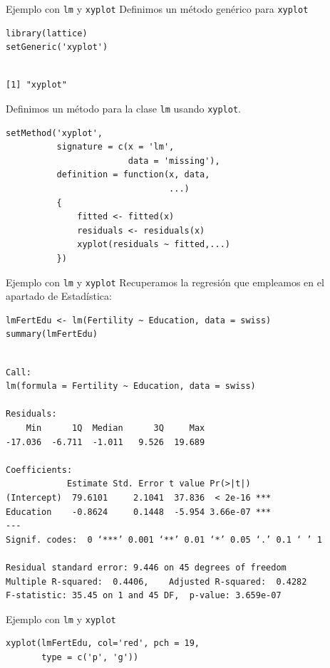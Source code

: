 \documentclass[xcolor={usenames,svgnames,dvipsnames}]{beamer}
\begin{document}
\begin{frame}[label={sec:orgec688bb},fragile]{Ejemplo con \texttt{lm} y \texttt{xyplot}}
 Definimos un método genérico para \texttt{xyplot}
\lstset{language=r,label= ,caption= ,captionpos=b,numbers=none}
\begin{lstlisting}
library(lattice)
setGeneric('xyplot')
\end{lstlisting}

\begin{verbatim}

[1] "xyplot"
\end{verbatim}


Definimos un método para la clase \texttt{lm} usando \texttt{xyplot}.
\lstset{language=r,label= ,caption= ,captionpos=b,numbers=none}
\begin{lstlisting}
setMethod('xyplot',
          signature = c(x = 'lm',
                        data = 'missing'),
          definition = function(x, data,
                                ...)
          {
              fitted <- fitted(x)
              residuals <- residuals(x)
              xyplot(residuals ~ fitted,...)
          })

\end{lstlisting}
\end{frame}

\begin{frame}[label={sec:org48f1499},fragile]{Ejemplo con \texttt{lm} y \texttt{xyplot}}
 Recuperamos la regresión que empleamos en el apartado de Estadística:
\lstset{language=r,label= ,caption= ,captionpos=b,numbers=none}
\begin{lstlisting}
lmFertEdu <- lm(Fertility ~ Education, data = swiss)
summary(lmFertEdu)
\end{lstlisting}

\begin{verbatim}

Call:
lm(formula = Fertility ~ Education, data = swiss)

Residuals:
    Min      1Q  Median      3Q     Max 
-17.036  -6.711  -1.011   9.526  19.689 

Coefficients:
            Estimate Std. Error t value Pr(>|t|)    
(Intercept)  79.6101     2.1041  37.836  < 2e-16 ***
Education    -0.8624     0.1448  -5.954 3.66e-07 ***
---
Signif. codes:  0 ‘***’ 0.001 ‘**’ 0.01 ‘*’ 0.05 ‘.’ 0.1 ‘ ’ 1

Residual standard error: 9.446 on 45 degrees of freedom
Multiple R-squared:  0.4406,	Adjusted R-squared:  0.4282 
F-statistic: 35.45 on 1 and 45 DF,  p-value: 3.659e-07
\end{verbatim}
\end{frame}


\begin{frame}[label={sec:org8abf2e5},fragile]{Ejemplo con \texttt{lm} y \texttt{xyplot}}
 \lstset{language=r,label= ,caption= ,captionpos=b,numbers=none}
\begin{lstlisting}
xyplot(lmFertEdu, col='red', pch = 19,
       type = c('p', 'g'))
\end{lstlisting}
\end{frame}
\end{document}

